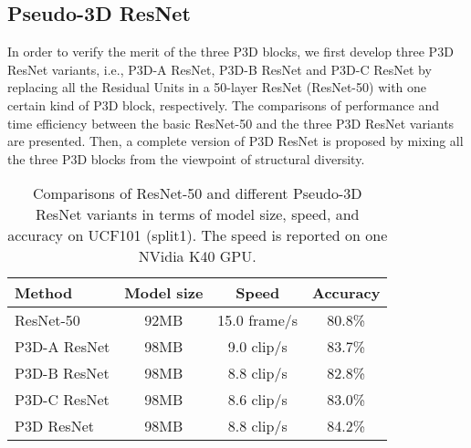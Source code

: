 \documentclass[10pt,twocolumn,letterpaper]{article}
\begin{document}
\subsection{Pseudo-3D ResNet}\label{ssec:PDR}
In order to verify the merit of the three P3D blocks, we first develop three P3D ResNet variants, i.e., P3D-A ResNet, P3D-B ResNet and P3D-C ResNet by replacing all the Residual Units in a 50-layer ResNet (ResNet-50) \cite{he2015deep} with one certain kind of P3D block, respectively. The comparisons of performance and time efficiency between the basic ResNet-50 and the three P3D ResNet variants are presented. Then, a complete version of P3D ResNet is proposed by mixing all the three P3D blocks from the viewpoint of structural diversity.

\begin{table}
\centering
\small
\caption{\small Comparisons of ResNet-50 and different Pseudo-3D ResNet variants in terms of model size, speed, and accuracy on UCF101 (split1). The speed is reported on one NVidia K40 GPU.}
\begin{tabular}{l|@{~~}c@{~~}|@{~~}c@{~~}|@{~~}c@{~~}} \hline
\textbf{Method}                                      & \textbf{Model size} & \textbf{Speed}  & \textbf{Accuracy} \\ \hline
ResNet-50                                            & 92MB                 & 15.0 frame/s    & 80.8\%           \\ \hline
P3D-A ResNet                                      & 98MB                 & 9.0 clip/s      & 83.7\%           \\
P3D-B ResNet                                      & 98MB                 & 8.8 clip/s      & 82.8\%           \\
P3D-C ResNet                                      & 98MB                 & 8.6 clip/s      & 83.0\%           \\ \hline
P3D ResNet                                        & 98MB                 & 8.8 clip/s      & 84.2\%           \\
\hline
\end{tabular}
\label{tab:s0m}
\vspace{-0.2in}
\end{table}
\end{document}
